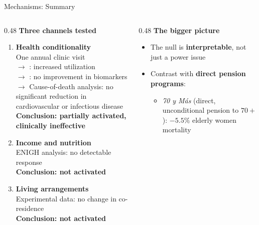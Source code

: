 \documentclass[aspectratio=169,usenames,dvipsnames]{beamer}
\newcommand{\smallcite}[1]{{\footnotesize\textcolor{Blue}{\citep{#1}}}}
\begin{document}
\begin{frame}{Mechanisms: Summary}\label{mechanisms_summary}
\small
\begin{columns}[T]
  \begin{column}{0.48\textwidth}
    \textbf{Three channels tested}
    \vspace{6pt}
    \begin{enumerate}
      \item \textbf{Health conditionality} \\
        One annual clinic visit \\[4pt]
        {\footnotesize $\to$ \smallcite{BehrmanParker2013Demography}: increased utilization \\
        $\to$ \smallcite{aguila2024conditional}: \textcolor{redUT}{no improvement in biomarkers} \\
        $\to$ Cause-of-death analysis: no significant reduction in cardiovascular or infectious disease \\
        \textbf{Conclusion: partially activated, clinically ineffective}}
      \vspace{8pt}
      \item \textbf{Income and nutrition} \\
        {\footnotesize ENIGH analysis: \textcolor{redUT}{no detectable response} \\
        \textbf{Conclusion: not activated}}
      \vspace{8pt}
      \item \textbf{Living arrangements} \\
        {\footnotesize Experimental data: \textcolor{redUT}{no change in co-residence} \\
        \textbf{Conclusion: not activated}}
    \end{enumerate}
  \end{column}
  \begin{column}{0.48\textwidth}
    \textbf{The bigger picture}
    \vspace{6pt}
    \begin{itemize}
      \item[$\circ$] The null is \textbf{interpretable}, not just a power issue
      \vspace{4pt}
      \item[$\circ$] Contrast with \textbf{direct pension programs}:
        \begin{itemize}
          \item \textit{70 y Más} (direct, unconditional pension to $70+$): $-5.5\%$ elderly women mortality \smallcite{jeon2025short}

\end{itemize}
\end{itemize}
\end{column}
\end{columns}
\end{frame}
\end{document}
